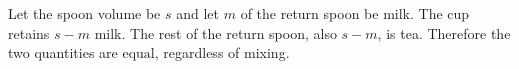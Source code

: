 Let the spoon volume be $s$ and let $m$ of the return spoon be milk. The cup retains $s-m$ milk. The rest of the return spoon, also $s-m$, is tea. Therefore the two quantities are $\boxed{\text{equal}}$, regardless of mixing.
